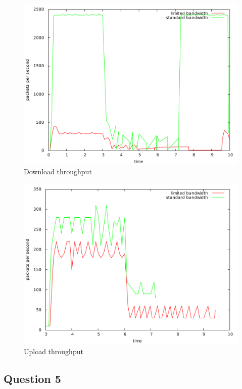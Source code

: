 \documentclass[10pt,a4paper]{article}
\begin{document}
\begin{figure}[p]
    \centering
    \includegraphics[width=\textwidth]{../part1/q4/plots/4-down.pdf}
    \caption{Download throughput}
    \label{fig:down_limited}
\end{figure}

\begin{figure}[p]
    \centering
    \includegraphics[width=\textwidth]{../part1/q4/plots/4-up.pdf}
    \caption{Upload throughput}
    \label{fig:up_limited}
\end{figure}

\subsection{Question 5}
\end{document}
